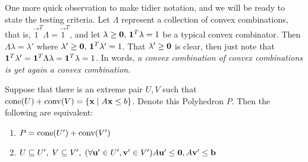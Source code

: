 One more quick observation to make tidier notation, and we will be ready to state the testing criteria.  Let $\Lambda$ represent a collection of convex combinations, that is, $\vec{1}^T\Lambda = \vec{1}^T$, and let $\lambda\geq\mathbf{0},\,\mathbf{1}^T\lambda = 1$ be a typical convex combinator.  Then $\Lambda\lambda = \lambda'$ where $\lambda'\geq\mathbf{0},\,\mathbf{1}^T\lambda'=1$.  That $\lambda'\geq\mathbf{0}$ is clear, then just note that $\mathbf{1}^T\lambda' = \mathbf{1}^T\Lambda\lambda = \mathbf{1}^T\lambda = 1$.  In words, \textit{a convex combination of convex combinations is yet again a convex combination}.

\begin{Prop}{\label{prop:hpolytest}
  Suppose that there is an extreme pair $U,V$ such that $\operatorname{cone}(U) + \operatorname{conv}(V) = \left\{\mathbf{x}\;|\; A\mathbf{x}\leq b\right\}$.  Denote this Polyhedron $P$.  Then the following are equivalent:
\begin{enumerate}
  \item $P = \operatorname{cone}(U') + \operatorname{conv}(V')$
  \item $U \sqsubseteq U',\; V \subseteq V',\; 
        (\forall \mathbf{u}'\in U',\mathbf{v}'\in V') A\mathbf{u}'\leq\mathbf{0}, A\mathbf{v}'\leq\mathbf{b}$
\end{enumerate}
}\end{Prop}

